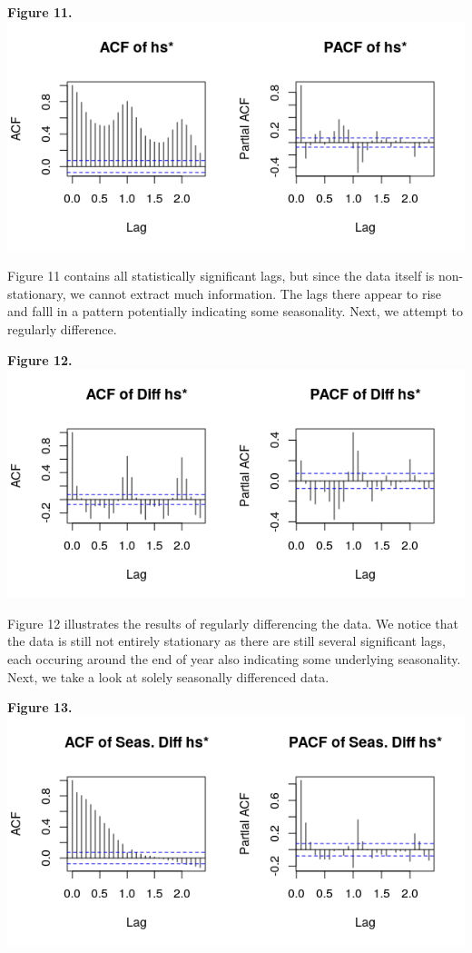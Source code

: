 \documentclass[11pt]{article}
\begin{document}
\begin{center}
\textbf{Figure 11.}
\\
\includegraphics[scale=1]{acf-hs}
\end{center}
Figure 11 contains all statistically significant lags, but since the data itself is non-stationary, we cannot extract much information. The lags there appear to rise and falll in a pattern potentially indicating some seasonality. Next, we attempt to regularly difference.
\begin{center}
\textbf{Figure 12.}
\\
\includegraphics[scale=1]{acf-reg}
\end{center}
Figure 12 illustrates the results of regularly differencing the data. We notice that the data is still not entirely stationary as there are still several significant lags, each occuring around the end of year also indicating some underlying seasonality. Next, we take a look at solely seasonally differenced data.
\begin{center}
\textbf{Figure 13.}
\\
\includegraphics[scale=1]{acf-seas}
\end{center}
\end{document}

